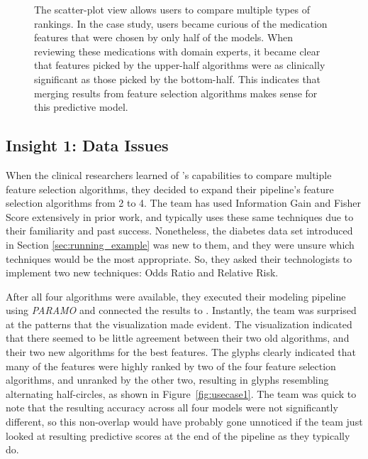 \begin{figure}
{\begin{tikzpicture}
\end{tikzpicture}%
}
\caption[The scatter-plot view allows to compare multiple types of rankings.]{
The scatter-plot view allows users to compare multiple types of rankings.  In the case study, users became curious of the medication features that were chosen by only half of the models.  When reviewing these medications with domain experts, it became clear that features picked by the upper-half algorithms were as clinically significant as those picked by the bottom-half.  This indicates that merging results from feature selection algorithms makes sense for this predictive model.
}
\label{fig:usecase2}
\end{figure}

\subsection{Insight 1: Data Issues}
When the clinical researchers learned of \infuse's capabilities
to compare multiple feature selection algorithms, they decided to
expand their pipeline's feature selection algorithms from 2 to 4.
The team has used Information Gain and Fisher Score extensively
in prior work, and typically uses these same techniques due
to their familiarity and past success.
Nonetheless, the diabetes data set introduced in Section \ref{sec:running_example} was new to them, and they were unsure which techniques would be the most appropriate. So, they asked their technologists to implement two new techniques: Odds Ratio and Relative Risk.

After all four algorithms were available, they executed their modeling pipeline
using \textit{PARAMO} \cite{paramo} and connected the results to \infuse.
Instantly, the team was surprised at the patterns that the visualization made evident.
The visualization indicated that there seemed to be little agreement between their two
old algorithms, and their two new algorithms for the best features.
The glyphs clearly indicated that many of the features were
highly ranked by two of the four feature selection algorithms,
and unranked by the other two, resulting in glyphs resembling alternating half-circles,
as shown in Figure~\ref{fig:usecase1}.
The team was quick to note that the resulting accuracy across
all four models were not significantly different,
so this non-overlap would have probably gone unnoticed if the
team just looked at resulting predictive scores at the
end of the pipeline as they typically do.

